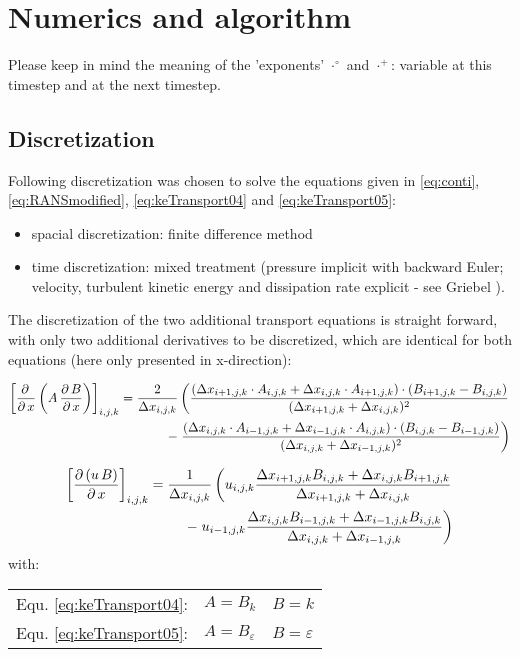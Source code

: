 \chapter{Numerics and algorithm} %
\label{cha:algorithm}

Please keep in mind the meaning of the 'exponents' $\left.\cdot^\circ\right.$ and $\left.\cdot^+\right.$: variable at this timestep and at the next timestep.

\section*{Discretization}

Following discretization was chosen to solve the equations given in \ref{eq:conti}, \ref{eq:RANSmodified}, \ref{eq:keTransport04} and \ref{eq:keTransport05}:
\begin{itemize}
\item spacial discretization: finite difference method
\item time discretization: mixed treatment (pressure implicit with backward Euler; velocity, turbulent kinetic energy and dissipation rate explicit - see Griebel \citep{griebel1998}).
\end{itemize}
The discretization of the two additional transport equations is straight forward, with only two additional derivatives to be discretized, which are identical for both equations (here only presented in x-direction):

\begin{align*}
\left[\frac{\partial\,}{\partial\,x}\left(A\,\frac{\partial\,B}{\partial\,x}\right)\right]_{i,j,k}
= \frac{2}{\Delta x_{i,j,k}}
\left( 
\frac{(\Delta x_{i+1,j,k}\cdot A_{i,j,k}+\Delta x_{i,j,k}\cdot A_{i+1,j,k}) \cdot (B_{i+1,j,k}-B_{i,j,k})}{(\Delta x_{i+1,j,k}+\Delta x_{i,j,k})^2} \right.\\
-\left.
\frac{(\Delta x_{i,j,k}\cdot A_{i-1,j,k}+\Delta x_{i-1,j,k}\cdot A_{i,j,k}) \cdot (B_{i,j,k}-B_{i-1,j,k})}{(\Delta x_{i,j,k}+\Delta x_{i-1,j,k})^2} 
\right)
\end{align*}

\begin{align*}
\left[\frac{\partial\,(u\,B)}{\partial\,x}\right]_{i,j,k}
= 
\frac{1}{\Delta x_{i,j,k}}\left(
u_{i,j,k}\frac{\Delta x_{i+1,j,k}B_{i,j,k}+\Delta x_{i,j,k}B_{i+1,j,k}}{\Delta x_{i+1,j,k}+\Delta x_{i,j,k}}\right.
\\-\left.
u_{i-1,j,k}\frac{\Delta x_{i,j,k}B_{i-1,j,k}+\Delta x_{i-1,j,k}B_{i,j,k}}{\Delta x_{i,j,k}+\Delta x_{i-1,j,k}}
\right)
\end{align*}
with:
\begin{center}
\begin{tabular}{lll}
Equ. \ref{eq:keTransport04}: & $A=B_k$           & $B=k$\\
Equ. \ref{eq:keTransport05}: & $A=B_\varepsilon$ & $B=\varepsilon$
\end{tabular}
\end{center}

